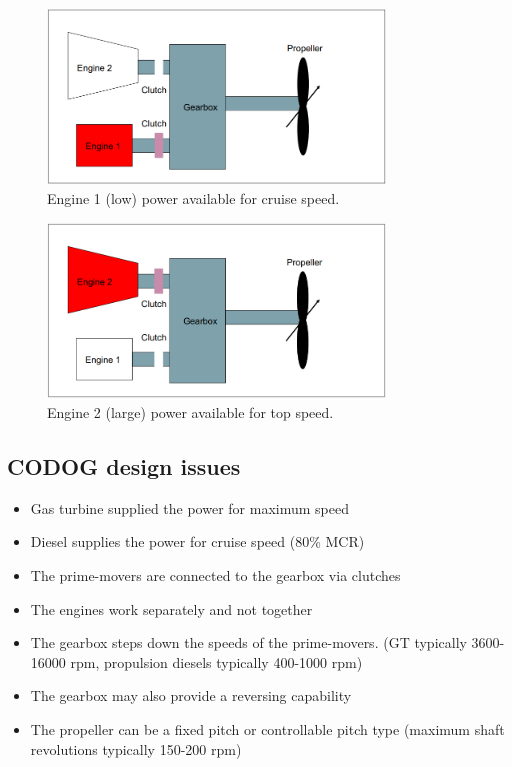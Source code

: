 \begin{figure}[H]
    \centering
    \includegraphics[width = 0.8\textwidth]{img/figure71.png}
    \caption{Engine 1 (low) power available for cruise speed.}
\end{figure}

\begin{figure}[H]
    \centering
    \includegraphics[width = 0.8\textwidth]{img/figure72.png}
    \caption{Engine 2 (large) power available for top speed.}
\end{figure}
\subsection{CODOG design issues}
\begin{itemize}
    \item Gas turbine supplied the power for maximum speed
    \item Diesel supplies the power for cruise speed (80\% MCR)
    \item The prime-movers are connected to the gearbox via clutches
    \item The engines work separately and not together
    \item The gearbox steps down the speeds of the prime-movers. (GT typically 3600-16000 \si{rpm}, propulsion diesels typically 400-1000 \si{rpm})
    \item The gearbox may also provide a reversing capability
    \item The propeller can be a fixed pitch or controllable pitch type (maximum shaft revolutions typically 150-200 \si{rpm})
\end{itemize}
